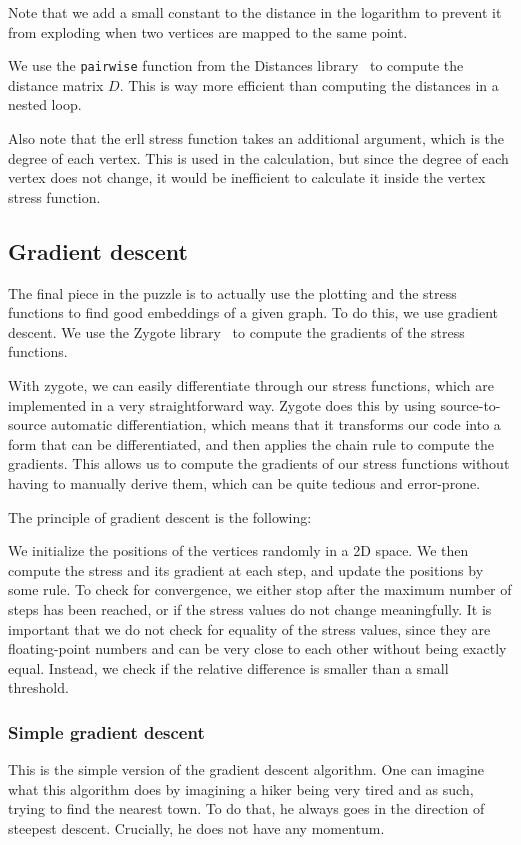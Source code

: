 \documentclass[12pt]{article}
\begin{document}
Note that we add a small constant to the distance in the logarithm to prevent it
from exploding when two vertices are mapped to the same point.

We use the \texttt{pairwise} function from the Distances library~\cite{distancesjl} to compute the distance matrix $D$.
This is way more efficient than computing the distances in a nested loop.

Also note that the erll stress function takes an additional argument,
which is the degree of each vertex. This is used in the calculation,
but since the degree of each vertex does not change,
it would be inefficient to calculate it inside the vertex stress function.

\subsection{Gradient descent}

The final piece in the puzzle is to actually use the plotting and the stress functions
to find good embeddings of a given graph. To do this, we use gradient descent.
We use the Zygote library~\cite{zygotejl} to compute the gradients of the stress functions.

With zygote, we can easily differentiate through our stress functions,
which are implemented in a very straightforward way. Zygote does this by using source-to-source automatic differentiation,
which means that it transforms our code into a form that can be differentiated, and then applies the chain rule to compute the gradients.
This allows us to compute the gradients of our stress functions without having to manually derive them, which can be quite
tedious and error-prone.

The principle of gradient descent is the following:

We initialize the positions of the vertices randomly in a 2D space.
We then compute the stress and its gradient at each step, and update the positions by some rule.
To check for convergence, we either stop after the maximum number of steps has been reached,
or if the stress values do not change meaningfully.
It is important that we do not check for equality of the stress values, since they are floating-point numbers and can be very close
to each other without being exactly equal. Instead, we check if the relative difference is smaller than a small threshold.


\subsubsection{Simple gradient descent}
This is the simple version of the gradient descent algorithm. One can imagine what this algorithm does by imagining a hiker
being very tired and as such, trying to find the nearest town. To do that, he always goes in the direction of steepest descent.
Crucially, he does not have any momentum.
\end{document}
